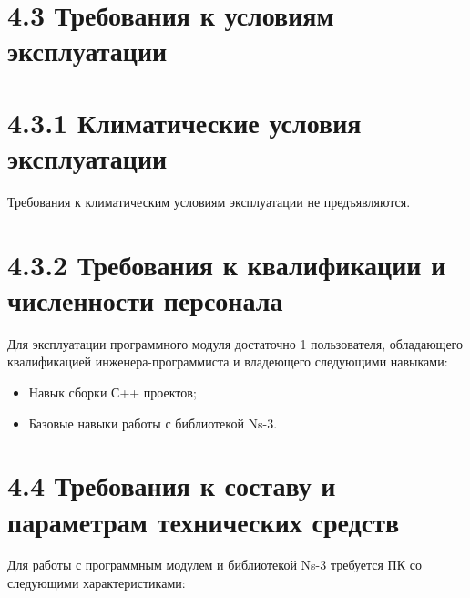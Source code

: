 \section{4.3 Требования к условиям
эксплуатации}\label{ux442ux440ux435ux431ux43eux432ux430ux43dux438ux44f-ux43a-ux443ux441ux43bux43eux432ux438ux44fux43c-ux44dux43aux441ux43fux43bux443ux430ux442ux430ux446ux438ux438}

\section{4.3.1 Климатические условия
эксплуатации}\label{ux43aux43bux438ux43cux430ux442ux438ux447ux435ux441ux43aux438ux435-ux443ux441ux43bux43eux432ux438ux44f-ux44dux43aux441ux43fux43bux443ux430ux442ux430ux446ux438ux438}

Требования к климатическим условиям эксплуатации не предъявляются.

\section{4.3.2 Требования к квалификации и численности
персонала}\label{ux442ux440ux435ux431ux43eux432ux430ux43dux438ux44f-ux43a-ux43aux432ux430ux43bux438ux444ux438ux43aux430ux446ux438ux438-ux438-ux447ux438ux441ux43bux435ux43dux43dux43eux441ux442ux438-ux43fux435ux440ux441ux43eux43dux430ux43bux430}

Для эксплуатации программного модуля достаточно 1 пользователя,
обладающего квалификацией инженера-программиста и владеющего следующими
навыками:

\begin{itemize}
\item
  Навык сборки С++ проектов;
\item
  Базовые навыки работы с библиотекой Ns-3.
\end{itemize}

\section{4.4 Требования к составу и параметрам технических
средств}\label{ux442ux440ux435ux431ux43eux432ux430ux43dux438ux44f-ux43a-ux441ux43eux441ux442ux430ux432ux443-ux438-ux43fux430ux440ux430ux43cux435ux442ux440ux430ux43c-ux442ux435ux445ux43dux438ux447ux435ux441ux43aux438ux445-ux441ux440ux435ux434ux441ux442ux432}

Для работы с программным модулем и библиотекой Ns-3 требуется ПК со
следующими характеристиками:

